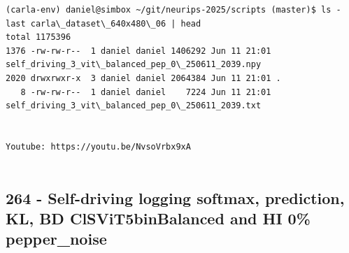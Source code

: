 \begin{verbatim}
(carla-env) daniel@simbox ~/git/neurips-2025/scripts (master)$ ls -last carla\_dataset\_640x480\_06 | head
total 1175396
1376 -rw-rw-r--  1 daniel daniel 1406292 Jun 11 21:01 self_driving_3_vit\_balanced_pep_0\_250611_2039.npy
2020 drwxrwxr-x  3 daniel daniel 2064384 Jun 11 21:01 .
   8 -rw-rw-r--  1 daniel daniel    7224 Jun 11 21:01 self_driving_3_vit\_balanced_pep_0\_250611_2039.txt


Youtube: https://youtu.be/NvsoVrbx9xA


\end{verbatim}

\subsection{264 - Self-driving logging softmax, prediction, KL, BD ClSViT5binBalanced and HI 0\% pepper\_noise}
\label{app_res:264}

